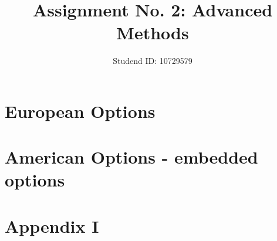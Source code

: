\documentclass{amsart}
\begin{document}
	
	\title{Assignment No. 2: Advanced Methods}
	\author{Studend ID: 10729579}
	\maketitle
	
	\vspace{-1cm}
	\section{European Options}
	
	
	\vspace{1cm}
	\section{American Options - embedded options}
	
	\newpage
	\setcounter{secnumdepth}{0}
	\section{Appendix I}
	
\end{document}
